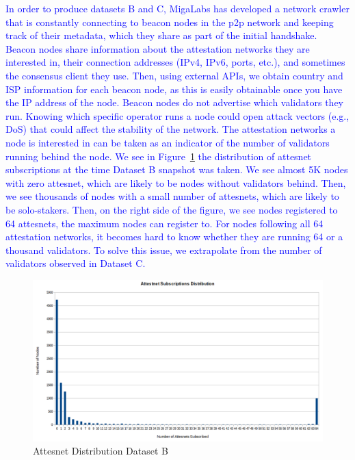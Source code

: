 \documentclass[conference]{IEEEtran}
\newcommand{\leo}[1]{\textcolor{blue}{#1}}
\begin{document}
\leo{In order to produce datasets B and C, MigaLabs has developed a network crawler that is constantly connecting to beacon nodes in the p2p network and keeping track of their metadata, which they share as part of the initial handshake. Beacon nodes share information about the attestation networks they are interested in, their connection addresses (IPv4, IPv6, ports, etc.), and sometimes the consensus client they use. Then, using external APIs, we obtain country and ISP information for each beacon node, as this is easily obtainable once you have the IP address of the node. Beacon nodes do not advertise which validators they run. Knowing which specific operator runs a node could open attack vectors (e.g., DoS) that could affect the stability of the network. The attestation networks a node is interested in can be taken as an indicator of the number of validators running behind the node. We see in Figure~\ref{fig:attesnets} the distribution of attesnet subscriptions at the time Dataset B snapshot was taken. We see almost 5K nodes with zero attesnet, which are likely to be nodes without validators behind. Then, we see thousands of nodes with a small number of attesnets, which are likely to be solo-stakers. Then, on the right side of the figure, we see nodes registered to 64 attesnets, the maximum nodes can register to. For nodes following all 64 attestation networks, it becomes hard to know whether they are running 64 or a thousand validators. To solve this issue, we extrapolate from the number of validators observed in Dataset C. }

\begin{figure}
    \centering
    \includegraphics[width=0.95\linewidth]{figures/attesnets.png}
    \caption{Attesnet Distribution Dataset B}
    \label{fig:attesnets}
\end{figure}
\end{document}
